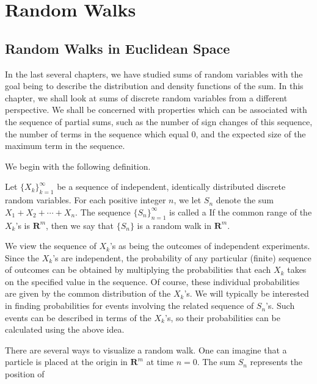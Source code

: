 

\chapter{Random Walks}\label{chp 12}  

\section{Random Walks in Euclidean Space}\label{sec 12.1}

\par
In the last several chapters, we have studied sums of random variables with the goal being
to describe the distribution and density functions of the sum.  In this chapter, we shall look
at sums of discrete random variables from a different perspective.  We shall be concerned with
properties which can be associated with the sequence of partial sums, such as the number of
sign changes of this sequence, the number of terms in the sequence which equal 0, and the
expected size of the maximum term in the sequence.
\par
We begin with the following definition.
\begin{definition} 
 Let $\{X_k\}_{k = 1}^\infty$ be a sequence of independent, identically distributed discrete
random variables.  For each positive integer $n$, we let $S_n$ denote the sum $X_1 + X_2 +
\cdots + X_n$.  The sequence $\{S_n\}_{n = 1}^\infty$ is called a   If the common range of the $X_k$'s is ${\mathbf R}^m$, then we say that
$\{S_n\}$ is a random walk in ${\mathbf R}^m$.
\end{definition} 
\par
We view the sequence of $X_k$'s as being the outcomes of independent experiments.  Since the
$X_k$'s are independent, the probability of any particular (finite) sequence of outcomes can be
obtained by multiplying the probabilities that each $X_k$ takes on the specified value in the
sequence.  Of course, these individual probabilities are given by the common distribution of the
$X_k$'s.  We will typically be interested in finding probabilities for events involving the
related sequence of $S_n$'s.  Such events can be described in terms of the $X_k$'s, so their
probabilities can be calculated using the above idea.
\par
There are several ways to visualize a random walk.  One can imagine that a particle is
placed at the origin in ${\mathbf R}^m$ at time $n = 0$.  The sum $S_n$ represents the position of
